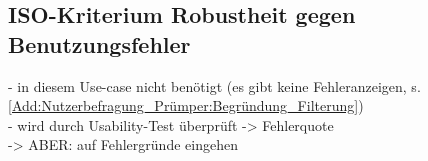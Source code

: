 \subsection*{ISO-Kriterium Robustheit gegen Benutzungsfehler}
- in diesem Use-case nicht benötigt (es gibt keine Fehleranzeigen, s. \autoref{Add:Nutzerbefragung_Prümper:Begründung_Filterung})\\
- wird durch Usability-Test überprüft -> Fehlerquote\\
-> ABER: auf Fehlergründe eingehen
